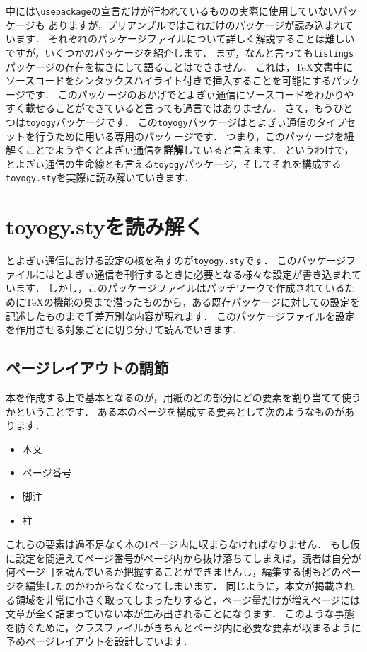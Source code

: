 中には\verb|\usepackage|の宣言だけが行われているものの実際に使用していないパッケージも
ありますが，プリアンブルではこれだけのパッケージが読み込まれています．
それぞれのパッケージファイルについて詳しく解説することは難しいですが，いくつかのパッケージを紹介します．
まず，なんと言っても\verb|listings|パッケージの存在を抜きにして語ることはできません．
これは，{\TeX}文書中にソースコードをシンタックスハイライト付きで挿入することを可能にするパッケージです．
このパッケージのおかげでとよぎぃ通信にソースコードをわかりやすく載せることができていると言っても過言ではありません．
さて，もうひとつは\verb|toyogy|パッケージです．
この\verb|toyogy|パッケージはとよぎぃ通信のタイプセットを行うために用いる専用のパッケージです．
つまり，このパッケージを紐解くことでようやくとよぎぃ通信を\textbf{詳解}していると言えます．
というわけで，とよぎぃ通信の生命線とも言える\verb|toyogy|パッケージ，そしてそれを構成する\verb|toyogy.sty|を実際に読み解いていきます．

\section{toyogy.styを読み解く}

とよぎぃ通信における設定の核を為すのが\texttt{toyogy.sty}です．
このパッケージファイルにはとよぎぃ通信を刊行するときに必要となる様々な設定が書き込まれています．
しかし，このパッケージファイルはパッチワークで作成されているために{\TeX}の機能の奥まで潜ったものから，ある既存パッケージに対しての設定を記述したものまで千差万別な内容が現れます．
このパッケージファイルを設定を作用させる対象ごとに切り分けて読んでいきます．

\subsection{ページレイアウトの調節}

本を作成する上で基本となるのが，用紙のどの部分にどの要素を割り当てて使うかということです．
ある本のページを構成する要素として次のようなものがあります．

\begin{itemize}
	\item 本文
	\item ページ番号
	\item 脚注
	\item 柱
\end{itemize}

これらの要素は過不足なく本の1ページ内に収まらなければなりません．
もし仮に設定を間違えてページ番号がページ内から抜け落ちてしまえば，読者は自分が何ページ目を読んでいるか把握することができませんし，編集する側もどのページを編集したのかわからなくなってしまいます．
同じように，本文が掲載される領域を非常に小さく取ってしまったりすると，ページ量だけが増えページには文章が全く詰まっていない本が生み出されることになります．
このような事態を防ぐために，クラスファイルがきちんとページ内に必要な要素が収まるように予めページレイアウトを設計しています．

